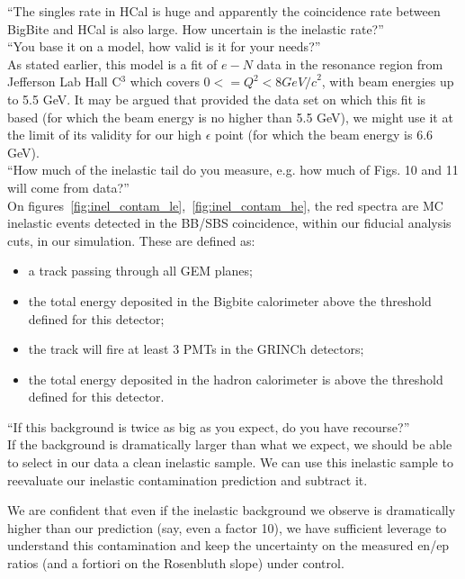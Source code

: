 \documentclass[11pt]{article}
\begin{document}
``The singles rate in HCal is huge and apparently the coincidence rate between BigBite and HCal is also large. How uncertain is the inelastic rate?''\\


``You base it on a model, how valid is it for your needs?''\\

As stated earlier, this model is a fit of $e-N$ data in the resonance region from Jefferson Lab Hall C$^{3}$ which covers $0<=Q^2<8 {GeV/c}^2$, with beam energies up to 5.5 GeV.
It may be argued that provided the data set on which this fit is based (for which
the beam energy is no higher than 5.5 GeV),
we might use it at the limit of its validity for our high $\epsilon$ point (for which
the beam energy is 6.6 GeV).\\

``How much of the inelastic tail do you measure, e.g. how much of Figs. 10 and 11 will come from data?''\\

On figures~\ref{fig:inel_contam_le},~\ref{fig:inel_contam_he}, the red spectra are MC inelastic events detected in the BB/SBS coincidence, within our fiducial analysis cuts, in our simulation.
These are defined as:
%
\begin{itemize}
\item{a track passing through all GEM planes;}
\item{the total energy deposited in the Bigbite calorimeter above the threshold defined for this detector;}
\item{the track will fire at least 3 PMTs in the GRINCh detectors;}
\item{the total energy deposited in the hadron calorimeter is above the threshold defined for this detector.}
\end{itemize}
%

``If this background is twice as big as you expect, do you have recourse?''\\

If the background is dramatically larger than what we expect, we should be able to select in our data a clean inelastic sample.
We can use this inelastic sample to reevaluate our inelastic contamination prediction and subtract it.%

We are confident that even if the inelastic background we observe is
dramatically higher than our prediction (say, even a factor 10), we have sufficient
leverage to understand this contamination and keep the uncertainty on the measured
en/ep ratios (and a fortiori on the Rosenbluth slope) under control. 
\fi
\end{document}
